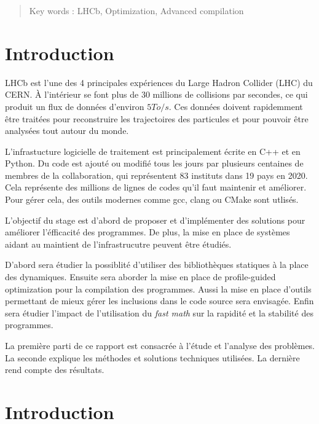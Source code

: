 \documentclass[a4paper]{report}
\begin{document}
\begin{otherlanguage}{english}
    \begin{abstract}

        \vfill

        Key words : LHCb, Optimization, Advanced compilation
    \end{abstract}
\end{otherlanguage}


\chapter*{Introduction}
LHCb est l'une des 4 principales expériences du Large Hadron Collider (LHC) du CERN.
À l'intérieur se font plus de 30 millions de collisions par secondes, ce qui produit un flux de données d'environ $5 To/s$.
Ces données doivent rapidemment être traitées pour reconstruire les trajectoires des particules et pour pouvoir être analysées tout autour du monde.

L'infrastucture logicielle de traitement est principalement écrite en C++ et en Python.
Du code est ajouté ou modifié tous les jours par plusieurs centaines de membres de la collaboration, qui représentent 83 instituts dans 19 pays en 2020.
Cela représente des millions de lignes de codes qu'il faut maintenir et améliorer.
Pour gérer cela, des outils modernes comme gcc, clang ou CMake sont utlisés.

L'objectif du stage est d'abord de proposer et d'implémenter des solutions pour améliorer l'éfficacité des programmes.
De plus, la mise en place de systèmes aidant au maintient de l'infrastrucutre peuvent être étudiés.

D'abord sera étudier la possiblité d'utiliser des bibliothèques statiques à la place des dynamiques.
Ensuite sera aborder la mise en place de profile-guided optimization pour la compilation des programmes.
Aussi la mise en place d'outils permettant de mieux gérer les inclusions dans le code source sera envisagée.
Enfin sera étudier l'impact de l'utilisation du \emph{fast math} sur la rapidité et la stabilité des programmes.

La première parti de ce rapport est consacrée à l'étude et l'analyse des problèmes.
La seconde explique les méthodes et solutions techniques utilisées.
La dernière rend compte des résultats.


\chapter{Introduction}
\end{document}
